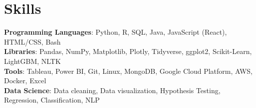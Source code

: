 \section{Skills}
 \begin{itemize}[leftmargin=0.15in, label={}]
    \small{\item{
     \textbf{Programming Languages}{: Python, R, SQL, Java, JavaScript (React), HTML/CSS, Bash} \\
     \textbf{Libraries}{: Pandas, NumPy, Matplotlib, Plotly, Tidyverse, ggplot2, Scikit-Learn, LightGBM, NLTK}\\
     \textbf{Tools}{: Tableau, Power BI, Git, Linux, MongoDB, Google Cloud Platform, AWS, Docker, Excel}\\
     \textbf{Data Science}{: Data cleaning, Data visualization, Hypothesis Testing, Regression, Classification, NLP}\\
    }}
 \end{itemize}